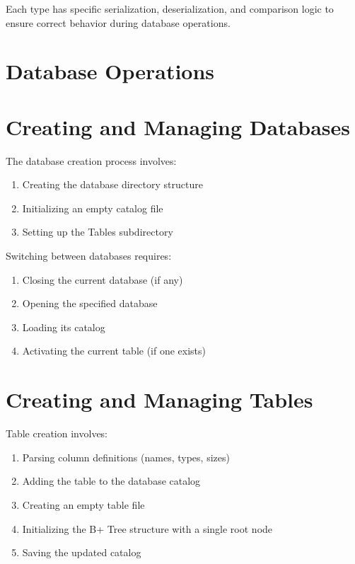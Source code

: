 \documentclass[12pt,a4paper]{article}  %
\begin{document}
Each type has specific serialization, deserialization, and comparison logic to ensure correct behavior during database operations.

\section{Database Operations}

\section{Creating and Managing Databases}

The database creation process involves:

\begin{enumerate}
    \item Creating the database directory structure
    \item Initializing an empty catalog file
    \item Setting up the Tables subdirectory
\end{enumerate}

Switching between databases requires:

\begin{enumerate}
    \item Closing the current database (if any)
    \item Opening the specified database
    \item Loading its catalog
    \item Activating the current table (if one exists)
\end{enumerate}

\section{Creating and Managing Tables}

Table creation involves:

\begin{enumerate}
    \item Parsing column definitions (names, types, sizes)
    \item Adding the table to the database catalog
    \item Creating an empty table file
    \item Initializing the B+ Tree structure with a single root node
    \item Saving the updated catalog
\end{enumerate}
\end{document}
